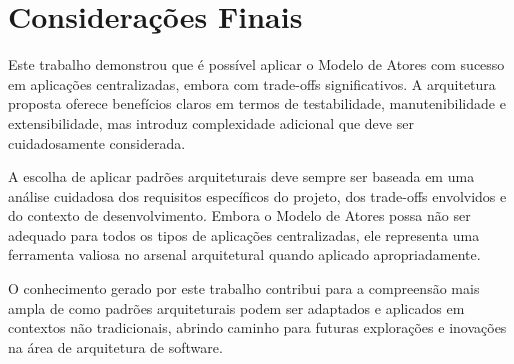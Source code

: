 
\section{Considerações Finais}

Este trabalho demonstrou que é possível aplicar o Modelo de Atores com sucesso em aplicações centralizadas, embora com trade-offs significativos. A arquitetura proposta oferece benefícios claros em termos de testabilidade, manutenibilidade e extensibilidade, mas introduz complexidade adicional que deve ser cuidadosamente considerada.

A escolha de aplicar padrões arquiteturais deve sempre ser baseada em uma análise cuidadosa dos requisitos específicos do projeto, dos trade-offs envolvidos e do contexto de desenvolvimento. Embora o Modelo de Atores possa não ser adequado para todos os tipos de aplicações centralizadas, ele representa uma ferramenta valiosa no arsenal arquitetural quando aplicado apropriadamente.

O conhecimento gerado por este trabalho contribui para a compreensão mais ampla de como padrões arquiteturais podem ser adaptados e aplicados em contextos não tradicionais, abrindo caminho para futuras explorações e inovações na área de arquitetura de software.

